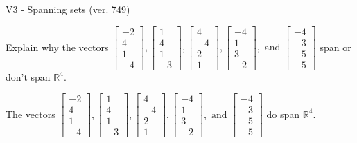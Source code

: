 \begin{exercise}
  \begin{exerciseTitle}V3 - Spanning sets (ver. 749)\end{exerciseTitle}
  \begin{exerciseStatement}
    Explain why the vectors \(\left[\begin{array}{r}
-2 \\
4 \\
1 \\
-4
\end{array}\right] , \left[\begin{array}{r}
1 \\
4 \\
1 \\
-3
\end{array}\right] , \left[\begin{array}{r}
4 \\
-4 \\
2 \\
1
\end{array}\right] , \left[\begin{array}{r}
-4 \\
1 \\
3 \\
-2
\end{array}\right] , \text{ and } \left[\begin{array}{r}
-4 \\
-3 \\
-5 \\
-5
\end{array}\right]\) span or don't span \(\mathbb{R}^4\). 
	


  \end{exerciseStatement}
  \begin{exerciseAnswer}
   The vectors \(\left[\begin{array}{r}
-2 \\
4 \\
1 \\
-4
\end{array}\right] , \left[\begin{array}{r}
1 \\
4 \\
1 \\
-3
\end{array}\right] , \left[\begin{array}{r}
4 \\
-4 \\
2 \\
1
\end{array}\right] , \left[\begin{array}{r}
-4 \\
1 \\
3 \\
-2
\end{array}\right] , \text{ and } \left[\begin{array}{r}
-4 \\
-3 \\
-5 \\
-5
\end{array}\right]\) 
  	 do  
	span \(\mathbb{R}^4\).
  



\end{exerciseAnswer}
\end{exercise}
